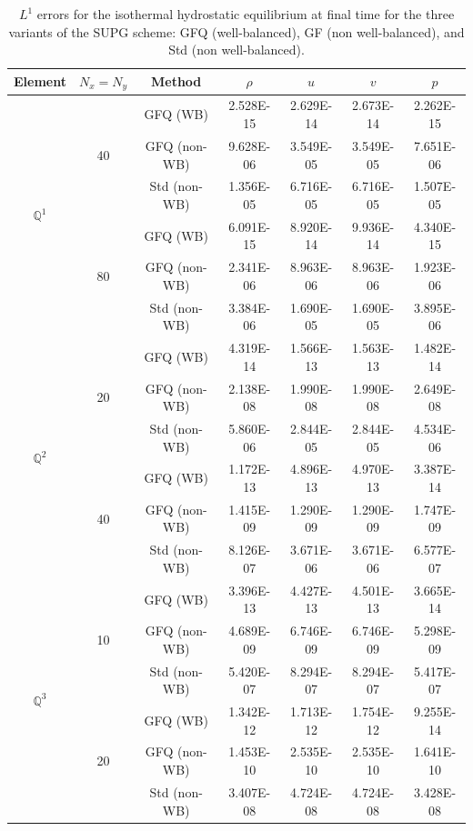 \documentclass[a4paper,10pt]{article}
\renewcommand{\arraystretch}{0}  %
\begin{document}
	\begin{table}[htbp]
	\centering
	\begin{threeparttable}
		\caption{$L^1$ errors for the isothermal hydrostatic equilibrium at final time for the three variants of the SUPG scheme: GFQ (well-balanced), GF (non well-balanced), and Std (non well-balanced).}
		\label{tab:isothermal_equilibrium_q1style}
		\small
		\begin{tabular}{c|c|c| c|c|c|c}
			\toprule
			Element & $N_x=N_y$ & Method & $\rho$ & $u$ & $v$ & $p$ \\
			\midrule
			
			\multirow{6}{*}{$\mathbb{Q}^1$}
			& \multirow{3}{*}{40}
			& GFQ (WB)          & 2.528E-15 & 2.629E-14 & 2.673E-14 & 2.262E-15 \\
			& & GFQ (non-WB)       & 9.628E-06 & 3.549E-05 & 3.549E-05 & 7.651E-06 \\
			& & Std (non-WB) & 1.356E-05 & 6.716E-05 & 6.716E-05 & 1.507E-05 \\
			\cmidrule(lr){2-7}
			& \multirow{3}{*}{80}
			& GFQ (WB)          & 6.091E-15 & 8.920E-14 & 9.936E-14 & 4.340E-15 \\
			& & GFQ (non-WB)       & 2.341E-06 & 8.963E-06 & 8.963E-06 & 1.923E-06 \\
			& & Std (non-WB) & 3.384E-06 & 1.690E-05 & 1.690E-05 & 3.895E-06 \\
			\midrule
			
			\multirow{6}{*}{$\mathbb{Q}^2$}
			& \multirow{3}{*}{20}
			& GFQ (WB)          & 4.319E-14 & 1.566E-13 & 1.563E-13 & 1.482E-14 \\
			& & GFQ (non-WB)       & 2.138E-08 & 1.990E-08 & 1.990E-08 & 2.649E-08 \\
			& & Std (non-WB) & 5.860E-06 & 2.844E-05 & 2.844E-05 & 4.534E-06 \\
			\cmidrule(lr){2-7}
			& \multirow{3}{*}{40}
			& GFQ (WB)          & 1.172E-13 & 4.896E-13 & 4.970E-13 & 3.387E-14 \\
			& & GFQ (non-WB)       & 1.415E-09 & 1.290E-09 & 1.290E-09 & 1.747E-09 \\
			& & Std (non-WB) & 8.126E-07 & 3.671E-06 & 3.671E-06 & 6.577E-07 \\
			\midrule
			
			\multirow{6}{*}{$\mathbb{Q}^3$}
			& \multirow{3}{*}{10}
			& GFQ (WB)          & 3.396E-13 & 4.427E-13 & 4.501E-13 & 3.665E-14 \\
			& & GFQ (non-WB)       & 4.689E-09 & 6.746E-09 & 6.746E-09 & 5.298E-09 \\
			& & Std (non-WB) & 5.420E-07 & 8.294E-07 & 8.294E-07 & 5.417E-07 \\
			\cmidrule(lr){2-7}
			& \multirow{3}{*}{20}
			& GFQ (WB)          & 1.342E-12 & 1.713E-12 & 1.754E-12 & 9.255E-14 \\
			& & GFQ (non-WB)       & 1.453E-10 & 2.535E-10 & 2.535E-10 & 1.641E-10 \\
			& & Std (non-WB) & 3.407E-08 & 4.724E-08 & 4.724E-08 & 3.428E-08 \\
			\midrule
			

\end{tabular}
\end{threeparttable}
\end{table}
\end{document}
